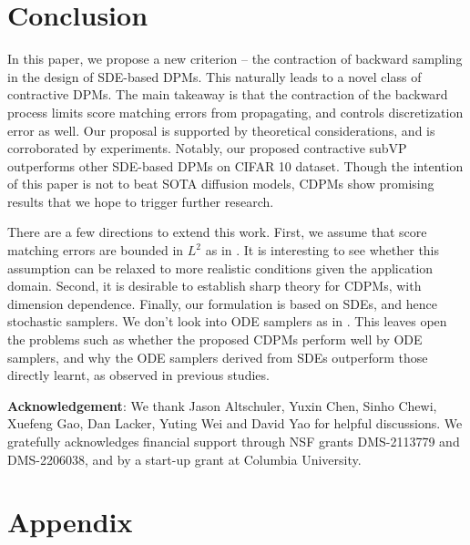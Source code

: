 \documentclass[letterpaper,10pt,reqno]{amsart}
\numberwithin{equation}{section}
\begin{document}
\section{Conclusion}
\label{sc5}

\quad In this paper,
we propose a new criterion -- 
the contraction of backward sampling
in the design of SDE-based DPMs.
This naturally leads to a novel class of contractive DPMs.
The main takeaway is that the contraction of the backward process
limits score matching errors from propagating,
and controls discretization error as well. 
Our proposal is supported by theoretical considerations,
and is corroborated by experiments. 
Notably, our proposed contractive subVP outperforms
other SDE-based DPMs on CIFAR 10 dataset.
Though the intention of this paper is not to beat SOTA diffusion models,
CDPMs show promising results
that we hope to trigger further research.

\quad There are a few directions to extend this work.
First, we assume that score matching errors
are bounded in $L^2$
as in \cite{Chen23, GNZ23, LLT23}.
It is interesting to see whether this assumption 
can be relaxed to more realistic conditions 
given the application domain. 
Second, it is desirable to establish sharp theory for CDPMs, with dimension dependence.
Finally, our formulation is based on SDEs,
and hence stochastic samplers.
We don't look into ODE samplers as in 
\cite{Song20,xu2022poisson,LW23, Chen23b}.
This leaves open the problems such as
whether the proposed CDPMs perform
well by ODE samplers,
and why the ODE samplers derived from SDEs
outperform those directly learnt,
as observed in previous studies.

\medskip
{\bf Acknowledgement}: 
We thank Jason Altschuler, Yuxin Chen, Sinho Chewi, Xuefeng Gao, Dan Lacker, Yuting Wei and David Yao for helpful discussions.
We gratefully acknowledges financial support through NSF grants DMS-2113779 and
DMS-2206038,
and by a start-up grant at Columbia University.




\clearpage
\appendix
\section*{Appendix}
\end{document}

